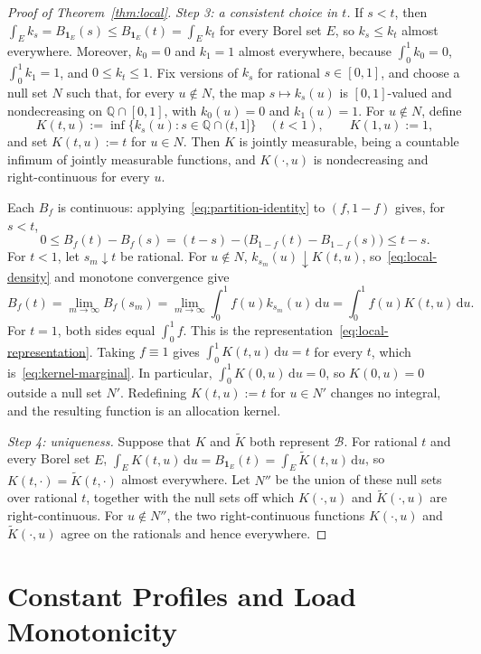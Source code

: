 \documentclass[11pt]{article}
\theoremstyle{definition}
\theoremstyle{remark}
\newcommand{\dd}{\,\mathrm d}
\newcommand{\ind}{\mathbf 1}
\begin{document}
\begin{proof}[Proof of Theorem~\ref{thm:local}]
\emph{Step 3: a consistent choice in $t$.}
If $s<t$, then $\int_Ek_s=B_{\ind_E}(s)\le B_{\ind_E}(t)=\int_Ek_t$ for every Borel set $E$, so $k_s\le k_t$ almost everywhere.
Moreover, $k_0=0$ and $k_1=1$ almost everywhere, because $\int_0^1k_0=0$, $\int_0^1k_1=1$, and $0\le k_t\le1$.
Fix versions of $k_s$ for rational $s\in[0,1]$, and choose a null set $N$ such that, for every $u\notin N$, the map $s\mapsto k_s(u)$ is $[0,1]$-valued and nondecreasing on $\mathbb Q\cap[0,1]$, with $k_0(u)=0$ and $k_1(u)=1$.
For $u\notin N$, define
\[
 K(t,u):=\inf\bigl\{k_s(u):s\in\mathbb Q\cap(t,1]\bigr\}\quad(t<1),
 \qquad
 K(1,u):=1,
\]
and set $K(t,u):=t$ for $u\in N$.
Then $K$ is jointly measurable, being a countable infimum of jointly measurable functions, and $K(\cdot,u)$ is nondecreasing and right-continuous for every $u$.

Each $B_f$ is continuous: applying~\eqref{eq:partition-identity} to $(f,1-f)$ gives, for $s<t$,
\[
 0\le B_f(t)-B_f(s)=(t-s)-\bigl(B_{1-f}(t)-B_{1-f}(s)\bigr)\le t-s.
\]
For $t<1$, let $s_m\downarrow t$ be rational.
For $u\notin N$, $k_{s_m}(u)\downarrow K(t,u)$, so~\eqref{eq:local-density} and monotone convergence give
\[
 B_f(t)=\lim_{m\to\infty}B_f(s_m)=\lim_{m\to\infty}\int_0^1f(u)k_{s_m}(u)\dd u=\int_0^1f(u)K(t,u)\dd u.
\]
For $t=1$, both sides equal $\int_0^1f$.
This is the representation~\eqref{eq:local-representation}.
Taking $f\equiv1$ gives $\int_0^1K(t,u)\dd u=t$ for every $t$, which is~\eqref{eq:kernel-marginal}.
In particular, $\int_0^1K(0,u)\dd u=0$, so $K(0,u)=0$ outside a null set $N'$.
Redefining $K(t,u):=t$ for $u\in N'$ changes no integral, and the resulting function is an allocation kernel.

\emph{Step 4: uniqueness.}
Suppose that $K$ and $\widetilde K$ both represent $\mathcal B$.
For rational $t$ and every Borel set $E$, $\int_EK(t,u)\dd u=B_{\ind_E}(t)=\int_E\widetilde K(t,u)\dd u$, so $K(t,\cdot)=\widetilde K(t,\cdot)$ almost everywhere.
Let $N''$ be the union of these null sets over rational $t$, together with the null sets off which $K(\cdot,u)$ and $\widetilde K(\cdot,u)$ are right-continuous.
For $u\notin N''$, the two right-continuous functions $K(\cdot,u)$ and $\widetilde K(\cdot,u)$ agree on the rationals and hence everywhere.
\end{proof}

\section{Constant Profiles and Load Monotonicity}\label{app:kernel-analysis}
\end{document}
